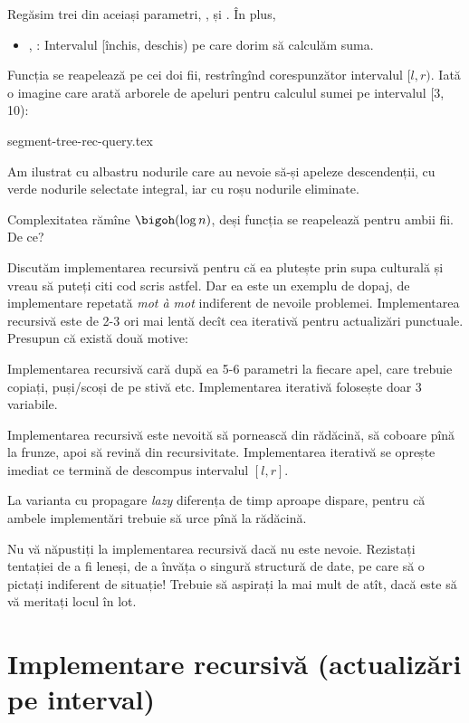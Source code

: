 Regăsim trei din aceiași parametri, ,  și . În plus,

\begin{itemize}
  \item {}, : Intervalul [închis, deschis) pe care dorim să calculăm suma.
\end{itemize}

Funcția se reapelează pe cei doi fii, restrîngînd corespunzător intervalul $[l, r)$. Iată o imagine care arată arborele de apeluri pentru calculul sumei pe intervalul [3, 10):

{segment-tree-rec-query.tex}

Am ilustrat cu albastru nodurile care au nevoie să-și apeleze descendenții, cu verde nodurile selectate integral, iar cu roșu nodurile eliminate.

Complexitatea rămîne $\bigoh(\log n)$, deși funcția se reapelează pentru ambii fii. De ce?

Discutăm implementarea recursivă pentru că ea plutește prin supa culturală și vreau să puteți citi cod scris astfel. Dar ea este un exemplu de dopaj, de implementare repetată \textit{mot à mot} indiferent de nevoile problemei. Implementarea recursivă este de 2-3 ori mai lentă decît cea iterativă pentru actualizări punctuale. Presupun că există două motive:

Implementarea recursivă cară după ea 5-6 parametri la fiecare apel, care trebuie copiați, puși/scoși de pe stivă etc. Implementarea iterativă folosește doar 3 variabile.

Implementarea recursivă este nevoită să pornească din rădăcină, să coboare pînă la frunze, apoi să revină din recursivitate. Implementarea iterativă se oprește imediat ce termină de descompus intervalul $[l,r]$.

La varianta cu propagare \textit{lazy} diferența de timp aproape dispare, pentru că ambele implementări trebuie să urce pînă la rădăcină.

Nu vă năpustiți la implementarea recursivă dacă nu este nevoie. Rezistați tentației de a fi leneși, de a învăța o singură structură de date, pe care să o pictați indiferent de situație! Trebuie să aspirați la mai mult de atît, dacă este să vă meritați locul în lot.

\section{Implementare recursivă (actualizări pe interval)}

